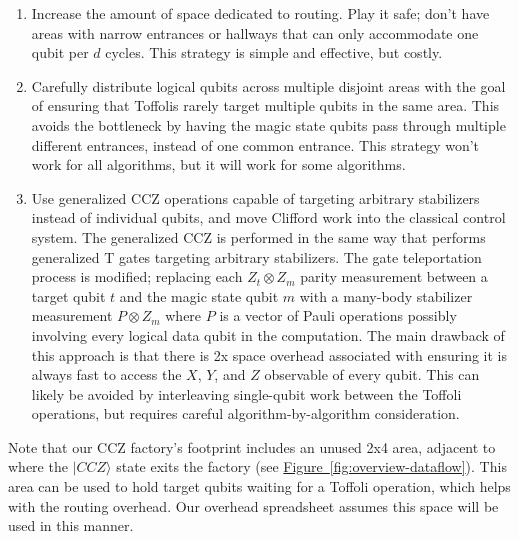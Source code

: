 \documentclass[superscriptaddress,notitlepage,longbibliography]{revtex4-1}
\newcommand{\fig}[1]{\hyperref[fig:#1]{Figure~\ref*{fig:#1}}}
\begin{document}
\begin{enumerate}
\item
    Increase the amount of space dedicated to routing.
    Play it safe; don't have areas with narrow entrances or hallways that can only accommodate one qubit per $d$ cycles.
    This strategy is simple and effective, but costly.
\item
    Carefully distribute logical qubits across multiple disjoint areas with the goal of ensuring that Toffolis rarely target multiple qubits in the same area.
    This avoids the bottleneck by having the magic state qubits pass through multiple different entrances, instead of one common entrance.
    This strategy won't work for all algorithms, but it will work for some algorithms.
\item
    Use generalized CCZ operations capable of targeting arbitrary stabilizers instead of individual qubits, and move Clifford work into the classical control system.
    The generalized CCZ is performed in the same way that \cite{litinski2018} performs generalized T gates targeting arbitrary stabilizers.
    The gate teleportation process is modified; replacing each $Z_t \otimes Z_m$ parity measurement between a target qubit $t$ and the magic state qubit $m$ with a many-body stabilizer measurement $P \otimes Z_m$ where $P$ is a vector of Pauli operations possibly involving every logical data qubit in the computation.
    The main drawback of this approach is that there is 2x space overhead associated with ensuring it is always fast to access the $X$, $Y$, and $Z$ observable of every qubit.
    This can likely be avoided by interleaving single-qubit work between the Toffoli operations, but requires careful algorithm-by-algorithm consideration.
\end{enumerate}

Note that our CCZ factory's footprint includes an unused 2x4 area, adjacent to where the $|CCZ\rangle$ state exits the factory (see \fig{overview-dataflow}).
This area can be used to hold target qubits waiting for a Toffoli operation, which helps with the routing overhead. Our overhead spreadsheet assumes this space will be used in this manner.
\end{document}
